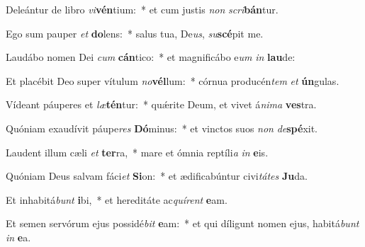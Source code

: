 \item Deleántur de libro \textit{vi}\textbf{vén}tium:~* et cum justis \textit{non} \textit{scri}\textbf{bán}tur.
\item Ego sum pauper \textit{et} \textbf{do}lens:~* salus tua, De\textit{us}, \textit{su}\textbf{scé}pit me.
\item Laudábo nomen Dei \textit{cum} \textbf{cán}tico:~* et magnificábo e\textit{um} \textit{in} \textbf{lau}de:
\item Et placébit Deo super vítulum \textit{no}\textbf{vél}lum:~* córnua producén\textit{tem} \textit{et} \textbf{ún}gulas.
\item Vídeant páuperes et \textit{læ}\textbf{tén}tur:~* quǽrite Deum, et vivet á\textit{ni}\textit{ma} \textbf{ves}tra.
\item Quóniam exaudívit páupe\textit{res} \textbf{Dó}minus:~* et vinctos suos \textit{non} \textit{de}\textbf{spé}xit.
\item Laudent illum cæli \textit{et} \textbf{ter}ra,~* mare et ómnia reptíli\textit{a} \textit{in} \textbf{e}is.
\item Quóniam Deus salvam fáci\textit{et} \textbf{Si}on:~* et ædificabúntur civi\textit{tá}\textit{tes} \textbf{Ju}da.
\item Et inhabitá\textit{bunt} \textbf{i}bi,~* et hereditáte ac\textit{quí}\textit{rent} \textbf{e}am.
\item Et semen servórum ejus possidé\textit{bit} \textbf{e}am:~* et qui díligunt nomen ejus, habitá\textit{bunt} \textit{in} \textbf{e}a.
